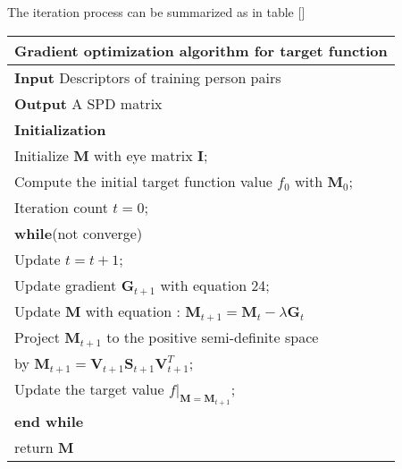  The iteration process can be summarized as in table [] \\
 \begin{table}[H]
 \centering
 \begin{tabular}{l}
 \hline 
 \multicolumn{1}{l}{\textbf{Gradient optimization algorithm for target function}} \\
 \hline
 \textbf{Input} Descriptors of training person pairs \\
 \textbf{Output} A SPD matrix\\
 \textbf{Initialization} \\
 Initialize $\bm{M}$ with eye matrix $\bm{I}$; \\
 Compute the initial target function value $f_0$ with $\bm{M}_0$;\\
 Iteration count  $t = 0$;\\

 \textbf{while}(not converge)\\
 \indent Update $t =  t + 1$;\\
 \indent Update gradient $\bm{G}_{t+1}$ with equation 24;\\
 \indent Update $\bm{M}$ with equation : $\bm{M}_{t+1} = \bm{M}_{t} - \lambda\bm{G}_t$\\
 \indent Project $\bm{M}_{t+1}$ to the positive semi-definite space \\ 
 \indent \indent by $\bm{M}_{t+1}= \bm{V}_{t+1}\bm{S}_{t+1}\bm{V}^T_{t+1}$;\\
 \indent Update the target value $f|_{\bm{M} = \bm{M}_{t+1}}$;\\
 \textbf{end while}  \\
 return $\bm{M}$\\
 \hline

 \end{tabular} 
 \end{table}


 
 
 
 
 
